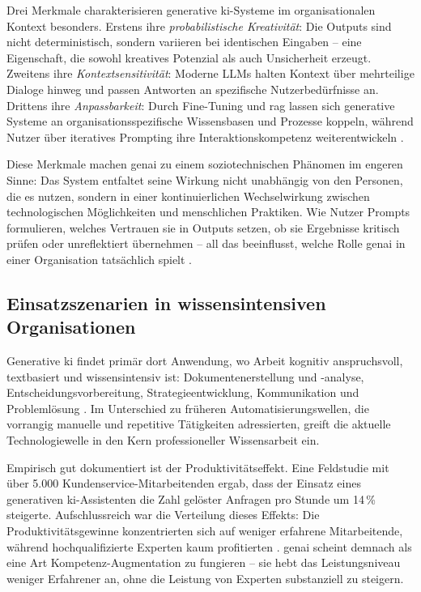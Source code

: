 Drei Merkmale charakterisieren generative \acrshort{ki}-Systeme im organisationalen Kontext besonders. Erstens ihre \textit{probabilistische Kreativität}: Die Outputs sind nicht deterministisch, sondern variieren bei identischen Eingaben -- eine Eigenschaft, die sowohl kreatives Potenzial als auch Unsicherheit erzeugt. Zweitens ihre \textit{Kontextsensitivität}: Moderne LLMs halten Kontext über mehrteilige Dialoge hinweg und passen Antworten an spezifische Nutzerbedürfnisse an. Drittens ihre \textit{Anpassbarkeit}: Durch Fine-Tuning und \gls{rag} lassen sich generative Systeme an organisationsspezifische Wissensbasen und Prozesse koppeln, während Nutzer über iteratives Prompting ihre Interaktionskompetenz weiterentwickeln \parencite{brynjolfssonGenerativeAIWork2025, bankinsMultilevelReviewArtificial2024}.

Diese Merkmale machen \gls{genai} zu einem soziotechnischen Phänomen im engeren Sinne: Das System entfaltet seine Wirkung nicht unabhängig von den Personen, die es nutzen, sondern in einer kontinuierlichen Wechselwirkung zwischen technologischen Möglichkeiten und menschlichen Praktiken. Wie Nutzer Prompts formulieren, welches Vertrauen sie in Outputs setzen, ob sie Ergebnisse kritisch prüfen oder unreflektiert übernehmen -- all das beeinflusst, welche Rolle \gls{genai} in einer Organisation tatsächlich spielt \parencite{bankinsMultilevelReviewArtificial2024}.


\subsection{Einsatzszenarien in wissensintensiven Organisationen}

Generative \gls{ki} findet primär dort Anwendung, wo Arbeit kognitiv anspruchsvoll, textbasiert und wissensintensiv ist: Dokumentenerstellung und -analyse, Entscheidungsvorbereitung, Strategieentwicklung, Kommunikation und Problemlösung \parencite{brynjolfssonGenerativeAIWork2025}. Im Unterschied zu früheren Automatisierungswellen, die vorrangig manuelle und repetitive Tätigkeiten adressierten, greift die aktuelle Technologiewelle in den Kern professioneller Wissensarbeit ein.

Empirisch gut dokumentiert ist der Produktivitätseffekt. Eine Feldstudie mit über 5.000 Kundenservice-Mitarbeitenden ergab, dass der Einsatz eines generativen \acrshort{ki}-Assistenten die Zahl gelöster Anfragen pro Stunde um 14\,\% steigerte. Aufschlussreich war die Verteilung dieses Effekts: Die Produktivitätsgewinne konzentrierten sich auf weniger erfahrene Mitarbeitende, während hochqualifizierte Experten kaum profitierten \parencite{brynjolfssonGenerativeAIWork2025}. \gls{genai} scheint demnach als eine Art Kompetenz-Augmentation zu fungieren -- sie hebt das Leistungsniveau weniger Erfahrener an, ohne die Leistung von Experten substanziell zu steigern.


